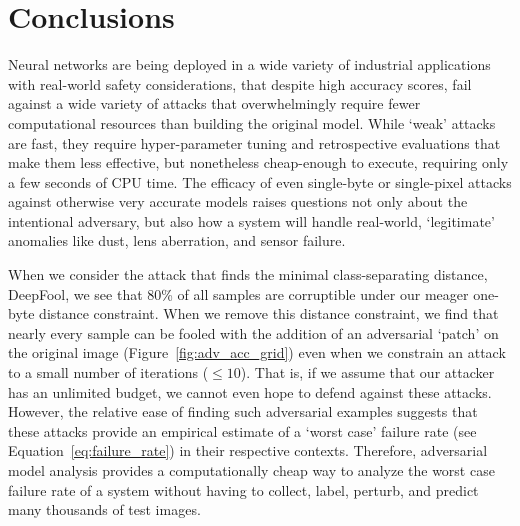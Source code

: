 \documentclass[lettersize,journal]{IEEEtran}
\begin{document}
\section{Conclusions}

Neural networks are being deployed in a wide variety of industrial applications with real-world safety considerations, that despite high accuracy scores, fail against a wide variety of attacks that overwhelmingly require fewer computational resources than building the original model. While `weak' attacks are fast, they require hyper-parameter tuning and retrospective evaluations that make them less effective, but nonetheless cheap-enough to execute, requiring only a few seconds of CPU time. The efficacy of even single-byte or single-pixel attacks against otherwise very accurate models raises questions not only about the intentional adversary, but also how a system will handle real-world, `legitimate' anomalies like dust, lens aberration, and sensor failure.

When we consider the attack that finds the minimal class-separating distance, DeepFool, we see that 80\% of all samples are corruptible under our meager one-byte distance constraint. When we remove this distance constraint, we find that nearly every sample can be fooled with the addition of an adversarial `patch' on the original image (Figure~\ref{fig:adv_acc_grid}) even when we constrain an attack to a small number of iterations ($\leq 10$). That is, if we assume that our attacker has an unlimited budget, we cannot even hope to defend against these attacks. However, the relative ease of finding such adversarial examples suggests that these attacks provide an empirical estimate of a `worst case' failure rate (see Equation~\ref{eq:failure_rate}) in their respective contexts. Therefore, adversarial model analysis provides a computationally cheap way to analyze the worst case failure rate of a system without having to collect, label, perturb, and predict many thousands of test images.
\end{document}
